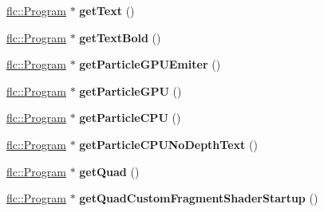 \begin{DoxyCompactItemize}
\item 
\hyperlink{classflw_1_1flc_1_1Program}{flc\+::\+Program} $\ast$ {\bfseries get\+Text} ()\hypertarget{classflw_1_1flf_1_1ProgramLoader_a9254450a2c4ccd57cd70fec88958a3d8}{}\label{classflw_1_1flf_1_1ProgramLoader_a9254450a2c4ccd57cd70fec88958a3d8}

\item 
\hyperlink{classflw_1_1flc_1_1Program}{flc\+::\+Program} $\ast$ {\bfseries get\+Text\+Bold} ()\hypertarget{classflw_1_1flf_1_1ProgramLoader_a4b9a2691d299bf88358a3223da5f63bb}{}\label{classflw_1_1flf_1_1ProgramLoader_a4b9a2691d299bf88358a3223da5f63bb}

\item 
\hyperlink{classflw_1_1flc_1_1Program}{flc\+::\+Program} $\ast$ {\bfseries get\+Particle\+G\+P\+U\+Emiter} ()\hypertarget{classflw_1_1flf_1_1ProgramLoader_afd852feb068bf1d5405d931f25ba8386}{}\label{classflw_1_1flf_1_1ProgramLoader_afd852feb068bf1d5405d931f25ba8386}

\item 
\hyperlink{classflw_1_1flc_1_1Program}{flc\+::\+Program} $\ast$ {\bfseries get\+Particle\+G\+PU} ()\hypertarget{classflw_1_1flf_1_1ProgramLoader_a330939320f8be4366c126df12ea86692}{}\label{classflw_1_1flf_1_1ProgramLoader_a330939320f8be4366c126df12ea86692}

\item 
\hyperlink{classflw_1_1flc_1_1Program}{flc\+::\+Program} $\ast$ {\bfseries get\+Particle\+C\+PU} ()\hypertarget{classflw_1_1flf_1_1ProgramLoader_a8be50ac2a9dd64f9d6d91ec4af98d268}{}\label{classflw_1_1flf_1_1ProgramLoader_a8be50ac2a9dd64f9d6d91ec4af98d268}

\item 
\hyperlink{classflw_1_1flc_1_1Program}{flc\+::\+Program} $\ast$ {\bfseries get\+Particle\+C\+P\+U\+No\+Depth\+Text} ()\hypertarget{classflw_1_1flf_1_1ProgramLoader_a4ce0245d4ddf8885219911a3d2fbc6a7}{}\label{classflw_1_1flf_1_1ProgramLoader_a4ce0245d4ddf8885219911a3d2fbc6a7}

\item 
\hyperlink{classflw_1_1flc_1_1Program}{flc\+::\+Program} $\ast$ {\bfseries get\+Quad} ()\hypertarget{classflw_1_1flf_1_1ProgramLoader_ab213b462187d31b87e3be7076208b2ee}{}\label{classflw_1_1flf_1_1ProgramLoader_ab213b462187d31b87e3be7076208b2ee}

\item 
\hyperlink{classflw_1_1flc_1_1Program}{flc\+::\+Program} $\ast$ {\bfseries get\+Quad\+Custom\+Fragment\+Shader\+Startup} ()\hypertarget{classflw_1_1flf_1_1ProgramLoader_ae43195e3b5dd62313054248fad19481d}{}\label{classflw_1_1flf_1_1ProgramLoader_ae43195e3b5dd62313054248fad19481d}


\end{DoxyCompactItemize}
